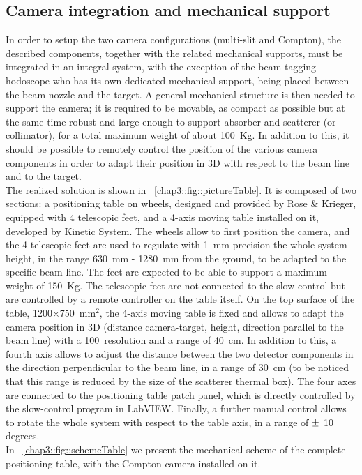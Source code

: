 
\subsection{Camera integration and mechanical support}\label{chap3::subsec::CameraMechanics}

In order to setup the two camera configurations (multi-slit and Compton), the described components, together with the related mechanical supports, must be integrated in an integral system, with the exception of the beam tagging hodoscope who has its own dedicated mechanical support, being placed between the beam nozzle and the target. A general mechanical structure is then needed to support the camera; it is required to be movable, as compact as possible but at the same time robust and large enough to support absorber and scatterer (or collimator), for a total maximum weight of about 100~Kg. In addition to this, it should be possible to remotely control the position of the various camera components in order to adapt their position in 3D with respect to the beam line and to the target.\\
The realized solution is shown in \figurename~\ref{chap3::fig::pictureTable}. It is composed of two sections: a positioning table on wheels, designed and provided by Rose \& Krieger, equipped with 4 telescopic feet, and a 4-axis moving table installed on it, developed by Kinetic System. The wheels allow to first position the camera, and the 4 telescopic feet are used to regulate with 1~mm precision the whole system height, in the range 630~mm - 1280~mm from the ground, to be adapted to the specific beam line. The feet are expected to be able to support a maximum weight of 150~Kg. The telescopic feet are not connected to the slow-control but are controlled by a remote controller on the table itself. On the top surface of the table, 1200$\times$750~mm$^2$, the 4-axis moving table is fixed and allows to adapt the camera position in 3D (distance camera-target, height, direction parallel to the beam line) with a 100~\charmum resolution and a range of 40~cm. In addition to this, a fourth axis allows to adjust the distance between the two detector components in the direction perpendicular to the beam line, in a range of 30~cm (to be noticed that this range is reduced by the size of the scatterer thermal box). The four axes are connected to the positioning table patch panel, which is directly controlled by the slow-control program in LabVIEW. Finally, a further manual control allows to rotate the whole system with respect to the table axis, in a range of $\varpm$ 10 degrees.\\
In \figurename~\ref{chap3::fig::schemeTable} we present the mechanical scheme of the complete positioning table, with the Compton camera installed on it.\\ 

